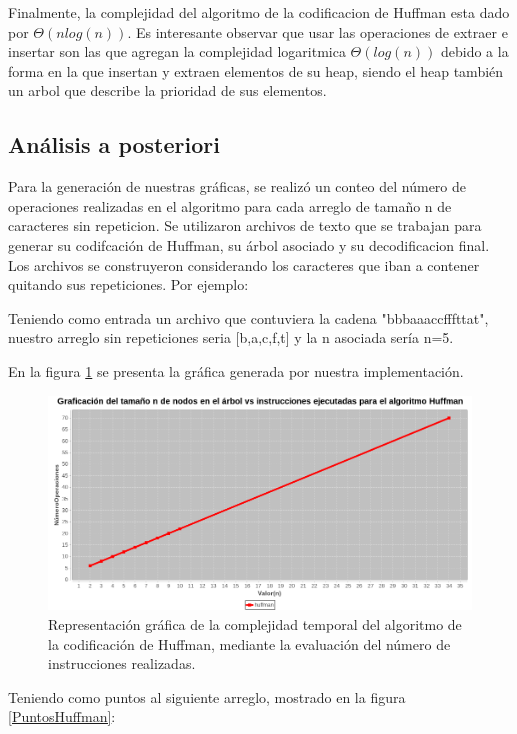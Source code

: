     Finalmente, la complejidad del algoritmo de la codificacion de Huffman esta dado por $\Theta(nlog(n))$. Es interesante observar que usar las operaciones de extraer e insertar son las que agregan la complejidad logaritmica $\Theta(log(n))$ debido a la forma en la que insertan y extraen elementos de su heap, siendo el heap también un arbol que describe la prioridad de sus elementos. 

\subsection*{Análisis a posteriori}

    Para la generación de nuestras gráficas, se realizó un conteo del número de operaciones realizadas en el algoritmo para cada arreglo de tamaño n de caracteres sin repeticion. Se utilizaron archivos de texto que se trabajan para generar su codifcación de Huffman, su árbol asociado y su decodificacion final. Los archivos se construyeron considerando los caracteres que iban a contener quitando sus repeticiones. Por ejemplo:
    
    Teniendo como entrada un archivo que contuviera la cadena "bbbaaaccfffttat", nuestro arreglo sin repeticiones seria [b,a,c,f,t] y la n asociada sería n=5.
    
    En la figura \ref{GraficaHuffman} se presenta la gráfica generada por nuestra implementación.
    
    \begin{figure}[h!]
        \centering
        \includegraphics[width=13cm]{Huffman/graf-huffman.png}
        \caption{Representación gráfica de la complejidad temporal del algoritmo de la codificación de Huffman, mediante la evaluación del número de instrucciones realizadas.}
        \label{GraficaHuffman}
    \end{figure}
    
    Teniendo como puntos al siguiente arreglo, mostrado en la figura \ref{PuntosHuffman}:
    
